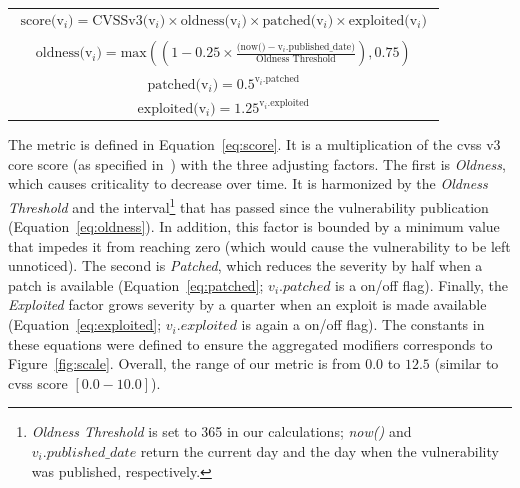 \begin{table}[h]
\begin{center}
\begin{tabular}{ c }

\vbox{
\begin{equation}
\begin{split}
\text{score(v$_i$)}=\text{CVSSv3(v$_i$)}\times\text{oldness(v$_i$)}\times\text{patched(v$_i$)}\times\text{exploited(v$_i$)}
\label{eq:score}
\end{split}
\end{equation}
}
\\
\vbox{
\begin{equation} 
\begin{split}
\text{oldness(v$_i$)}=\text{max}\left((1-0.25\times\frac{(\text{now()}-\text{v$_i$.published\_date)}}{\text{Oldness Threshold}}), 0.75\right)
\label{eq:oldness}
\end{split}
\end{equation}
}
\\
\vbox{
\begin{equation} 
\text{patched(v$_i$)}=0.5^{\text{v$_i$.patched}}
\label{eq:patched}
\end{equation} 
}
\\
\vbox{
\begin{equation}
\text{exploited(v$_i$)} = 1.25^{\text{v$_i$.exploited}}
\label{eq:exploited}
\end{equation}  
}
\\ 
\end{tabular}
\end{center}
\end{table}

The metric is defined in Equation~\ref{eq:score}.
It is a multiplication of the \gls{cvss} v3 core score (as specified in~\cite{cvssv3}) with the three adjusting factors. 
The first is \emph{Oldness}, which causes criticality to decrease over time. 
It is harmonized by the \emph{Oldness Threshold} and the interval\footnote{\textit{Oldness Threshold} is set to 365 in our calculations; \textit{now()} and $v_i.published\_date$ return the current day and the day when the vulnerability was published, respectively.} that has passed since the vulnerability publication (Equation~\ref{eq:oldness}). 
In addition, this factor is bounded by a minimum value that impedes it from reaching zero (which would cause the vulnerability to be left unnoticed).
The second is \emph{Patched}, which reduces the severity by half when a patch is available (Equation~\ref{eq:patched}; $v_{i}.patched$ is a on/off flag).
Finally, the \emph{Exploited} factor grows severity by a quarter when an exploit is made available (Equation~\ref{eq:exploited}; $v_{i}.exploited$ is again a on/off flag).
The constants in these equations were defined to ensure the aggregated modifiers corresponds to Figure~\ref{fig:scale}.
Overall, the range of our metric is from $0.0$ to $12.5$ (similar to \gls{cvss} score $[0.0-10.0]$).


